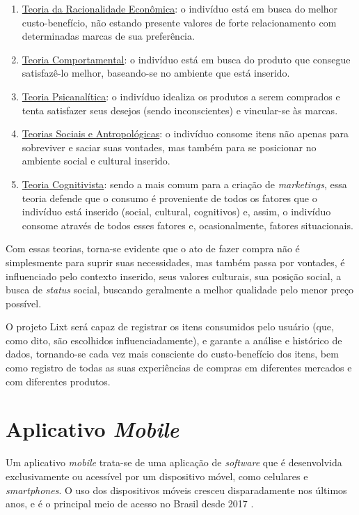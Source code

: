 \begin{enumerate}

	\item \underline{Teoria da Racionalidade Econômica}: o indivíduo está em busca do melhor custo-benefício, não estando presente valores de forte relacionamento com determinadas marcas de sua preferência.

	\item \underline{Teoria Comportamental}: o indivíduo está em busca do produto que consegue satisfazê-lo melhor, baseando-se no ambiente que está inserido.

	\item \underline{Teoria Psicanalítica}: o indivíduo idealiza os produtos a serem comprados e tenta satisfazer seus desejos (sendo inconscientes) e vincular-se às marcas.

	\item \underline{Teorias Sociais e Antropológicas}: o indivíduo consome itens não apenas para sobreviver e saciar suas vontades, mas também para se posicionar no ambiente social e cultural inserido.

	\item \underline{Teoria Cognitivista}: sendo a mais comum para a criação de \textit{marketings}, essa teoria defende que o consumo é proveniente de todos os fatores que o indivíduo está inserido (social, cultural, cognitivos) e, assim, o indivíduo consome através de todos esses fatores e, ocasionalmente, fatores situacionais.
	
\end{enumerate}

Com essas teorias, torna-se evidente que o ato de fazer compra não é simplesmente para suprir suas necessidades, mas também passa por vontades, é influenciado pelo contexto inserido, seus valores culturais, sua posição social, a busca de \textit{status} social, buscando geralmente a melhor qualidade pelo menor preço possível.

O projeto Lixt será capaz de registrar os itens consumidos pelo usuário (que, como dito, são escolhidos influenciadamente), e garante a análise e histórico de dados, tornando-se cada vez mais consciente do custo-benefício dos itens, bem como registro de todas as suas experiências de compras em diferentes mercados e com diferentes produtos.

\section{Aplicativo \textit{Mobile}}
Um aplicativo \textit{mobile} trata-se de uma aplicação de \textit{software} que é desenvolvida exclusivamente ou acessível por um dispositivo móvel, como celulares e \textit{smartphones}. O uso dos dispositivos móveis cresceu disparadamente nos últimos anos, e é o principal meio de acesso no Brasil desde 2017 \cite{Celular}.

